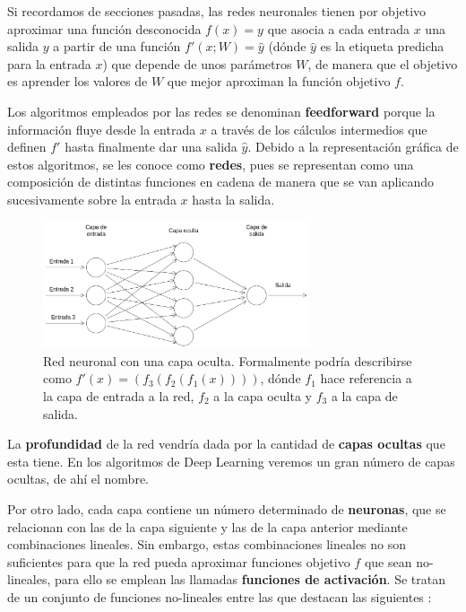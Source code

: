             \medskip

            \noindent Si recordamos de secciones pasadas, las redes neuronales tienen por objetivo aproximar una función desconocida $f(x)=y$ que asocia a cada entrada $x$ una salida $y$ a partir de una función $f'(x;W)= \widehat{y}$ (dónde $\widehat{y}$ es la etiqueta predicha para la entrada $x$) que depende de unos parámetros $W$, de manera que el objetivo es aprender los valores de $W$ que mejor aproximan la función objetivo $f$.

            \medskip

            \noindent Los algoritmos empleados por las redes se denominan \textbf{feedforward} porque la información fluye desde la entrada $x$ a través de los cálculos intermedios que definen $f'$ hasta finalmente dar una salida $\widehat{y}$. Debido a la representación gráfica de estos algoritmos, se les conoce como \textbf{redes}, pues se representan como una composición de distintas funciones en cadena de manera que se van aplicando sucesivamente sobre la entrada $x$ hasta la salida.

            \begin{figure}[!h]
                \centering
                \includegraphics[width=0.7\textwidth]{img/single_hidden_layer.png}
                \caption{Red neuronal con una capa oculta. Formalmente podría describirse como $f'(x)=(f_3(f_2(f_1(x))))$, dónde $f_1$ hace referencia a la capa de entrada a la red, $f_2$ a la capa oculta y $f_3$ a la capa de salida.}
                \label{fig:red_neuronal_capa_oculta}
            \end{figure}

            \noindent La \textbf{profundidad} de la red vendría dada por la cantidad de \textbf{capas ocultas} que esta tiene. En los algoritmos de Deep Learning veremos un gran número de capas ocultas, de ahí el nombre. 

            \medskip

            \noindent Por otro lado, cada capa contiene un número determinado de \textbf{neuronas}, que se relacionan con las de la capa siguiente y las de la capa anterior mediante combinaciones lineales. Sin embargo, estas combinaciones lineales no son suficientes para que la red pueda aproximar funciones objetivo $f$ que sean no-lineales, para ello se emplean las llamadas \textbf{funciones de activación}. Se tratan de un conjunto de funciones no-lineales entre las que destacan las siguientes \cite{sharma2017activation}: 

